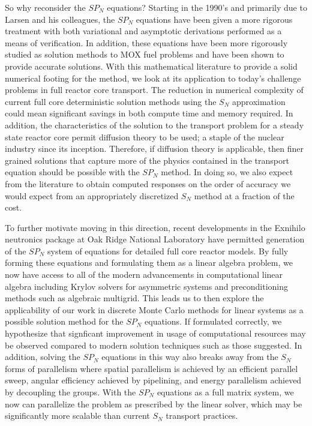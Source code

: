 So why reconsider the $SP_N$ equations? Starting in the 1990's and
primarily due to Larsen and his colleagues, the $SP_N$ equations have
been given a more rigorous treatment with both variational and
asymptotic derivations performed as a means of verification. In
addition, these equations have been more rigorously studied as
solution methods to MOX fuel problems and have been shown to provide
accurate solutions. With this mathematical literature to provide a
solid numerical footing for the method, we look at its application to
today's challenge problems in full reactor core transport. The
reduction in numerical complexity of current full core deterministic
solution methods using the $S_N$ approximation could mean significant
savings in both compute time and memory required. In addition, the
characteristics of the solution to the transport problem for a steady
state reactor core permit diffusion theory to be used; a staple of the
nuclear industry since its inception. Therefore, if diffusion theory
is applicable, then finer grained solutions that capture more of the
physics contained in the transport equation should be possible with
the $SP_N$ method. In doing so, we also expect from the literature to
obtain computed responses on the order of accuracy we would expect
from an appropriately discretized $S_N$ method at a fraction of the
cost. 

To further motivate moving in this direction, recent developments in
the Exnihilo neutronics package at Oak Ridge National Laboratory have
permitted generation of the $SP_N$ system of equations for detailed
full core reactor models. By fully forming these equations and
formulating them as a linear algebra problem, we now have access to
all of the modern advancements in computational linear algebra
including Krylov solvers for asymmetric systems and preconditioning
methods such as algebraic multigrid. This leads us to then explore the
applicability of our work in discrete Monte Carlo methods for linear
systems as a possible solution method for the $SP_N$ equations. If
formulated correctly, we hypothesize that signficant improvement in
usage of computational resources may be observed compared to modern
solution techniques such as those suggested. In addition, solving the
$SP_N$ equations in this way also breaks away from the $S_N$ forms of
parallelism where spatial parallelism is achieved by an efficient
parallel sweep, angular efficiency achieved by pipelining, and energy
parallelism achieved by decoupling the groups. With the $SP_N$
equations as a full matrix system, we now can parallelize the problem
as prescribed by the linear solver, which may be significantly more
scalable than current $S_N$ transport practices.

